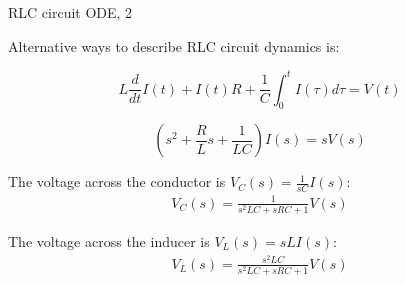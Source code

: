 \documentclass{beamer}
\begin{document}
\begin{frame}{RLC circuit ODE, 2}
	\begin{flushleft}
		
		Alternative ways to describe RLC circuit dynamics is:
		
		\begin{equation}
			L \frac{d}{dt}I(t) + I(t)R + \frac{1}{C} \int_0^{t} I(\tau) d\tau = V(t)
		\end{equation}
		
		\begin{equation}
			\left(s^2 + \frac{R}{L}s + \frac{1}{LC} \right)I(s) = sV(s)
		\end{equation}
		
		The voltage across the conductor is $V_C(s) = \frac{1}{sC} I(s)$:
		\begin{align}
			V_C(s) = \frac{1}{s^2 LC + s RC + 1} V(s)
		\end{align}
		
		The voltage across the inducer is $V_L(s) = sLI(s)$:
		\begin{align}
			V_L(s) = \frac{s^2 LC}{s^2 LC + s RC + 1} V(s)
		\end{align}
				
	\end{flushleft}
\end{frame}



\myqrframe
\end{document}
